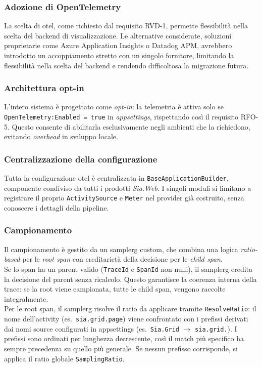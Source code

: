 \subsubsection{Adozione di OpenTelemetry}

La scelta di \gls{otel}, come richiesto dal requisito RVD-1, permette flessibilità nella scelta
del backend di visualizzazione.
Le alternative considerate, soluzioni proprietarie come Azure Application Insights o Datadog APM,
avrebbero introdotto un accoppiamento stretto con un singolo fornitore, limitando la
flessibilità nella scelta del backend e rendendo difficoltosa la migrazione futura.

\subsubsection{Architettura opt-in}

L'intero sistema è progettato come \emph{opt-in}: la telemetria è attiva solo se\\
\texttt{OpenTelemetry:Enabled = true} in \emph{appsettings}, rispettando così il requisito RFO-5.
Questo consente di abilitarla esclusivamente negli ambienti che la richiedono, evitando \emph{overhead} in sviluppo locale.

\subsubsection{Centralizzazione della configurazione}

Tutta la configurazione \gls{otel} è centralizzata in \texttt{BaseApplicationBuilder},
componente condiviso da tutti i prodotti \emph{Sia.Web}. I singoli moduli si limitano a
registrare il proprio \texttt{ActivitySource} e \texttt{Meter} nel provider gi\`a
costruito, senza conoscere i dettagli della pipeline.

\subsubsection{Campionamento}

Il campionamento è gestito da un \gls{samplerg} custom, che
combina una logica \emph{ratio-based} per le \emph{root span} con ereditarietà
della decisione per le \emph{child span}.\\
Se lo span ha un parent valido (\texttt{TraceId} e \texttt{SpanId} non nulli),
il \gls{samplerg} eredita la decisione del parent senza ricalcolo. Questo garantisce la
coerenza interna della trace: se la root viene campionata, tutte le child span,
vengono raccolte integralmente.\\
Per le root span, il \gls{samplerg} risolve il ratio da applicare tramite \texttt{ResolveRatio}:
il nome dell'activity (es.\ \texttt{sia.grid.page}) viene confrontato con i prefissi
derivati dai nomi source configurati in appsettings (es.\ \texttt{Sia.Grid}
$\to$ \texttt{sia.grid.}). I prefissi sono ordinati per lunghezza decrescente, così
il match più specifico ha sempre precedenza su quello più generale. Se nessun prefisso
corrisponde, si applica il ratio globale \texttt{SamplingRatio}.

